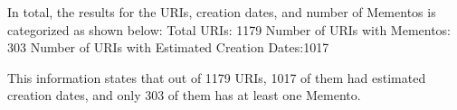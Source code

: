 \documentclass[11pt]{scrartcl} %
\begin{document}
In total, the results for the URIs, creation dates, and number of Mementos is categorized as shown below: \newline \newline
Total URIs: 1179 \newline
Number of URIs with Mementos: 303\newline
Number of URIs with Estimated Creation Dates:1017\newline

This information states that out of 1179 URIs, 1017 of them had estimated creation dates, and only 303 of them has at least one Memento.
\end{document}
